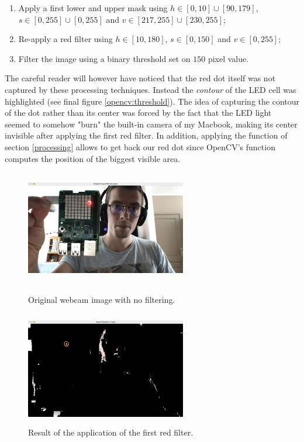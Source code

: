 \begin{enumerate}
	\item Apply a first lower and upper mask using $h \in [0, 10] \cup [90,179] $,  $s \in [0, 255] \cup [0,255]$ and $v \in [217, 255] \cup [230,255]$;
	\item Re-apply a red filter using $h \in [10, 180] $,  $s \in [0, 150]$ and $v \in [0, 255]$;
	\item Filter the image using a binary threshold set on $150$ pixel value.
\end{enumerate}

The careful reader will however have noticed that the red dot itself was not captured by these processing techniques. Instead the \textit{contour} of the LED cell was highlighted (see final figure \ref{opencv:threshold}). The idea of capturing the contour of the dot rather than its center was forced by the fact that the LED light seemed to somehow "burn" the built-in camera of my Macbook, making its center invisible after applying the first red filter.  In addition, applying the \texttt{} function of section \ref{processing} allows to get back our red dot since OpenCV's \texttt{} function computes the position of the biggest visible area. 

\begin{figure}[H]

  \begin{minipage}[b]{0.45\linewidth}
   \centering
   \includegraphics[width=7cm,height=5cm]{Images/original.png}
   \caption{Original webcam image with no filtering.}
   \label{opencv:original}
  \end{minipage}
\hfill
  \begin{minipage}[b]{0.45\linewidth}
   \centering
   \includegraphics[width=7cm,height=5cm]{Images/red_filter.png}
   \caption{Result of the application of the first red filter.}
   \label{opencv:red_filter}
  \end{minipage}
\end{figure}

